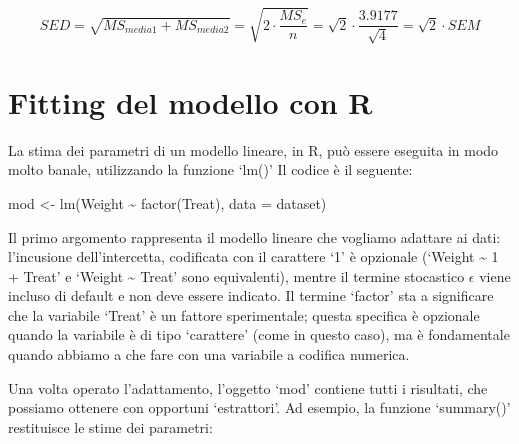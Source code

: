 \documentclass[a4paper,12pt,oneside]{book}
\newenvironment{Shaded}{\begin{snugshade}}{\end{snugshade}}
\newcommand{\SpecialCharTok}[1]{#1}
\newcommand{\OtherTok}[1]{#1}
\newcommand{\FunctionTok}[1]{#1}
\newcommand{\AttributeTok}[1]{#1}
\newcommand{\NormalTok}[1]{#1}
\begin{document}
\[SED = \sqrt{ MS_{media1} + MS_{media2} } = \sqrt{ 2 \cdot \frac{MS_e}{n} } =  \sqrt{2}  \cdot \frac{3.9177}{\sqrt{4}} = \sqrt{2} \cdot SEM\]

\hypertarget{fitting-del-modello-con-r}{%
\section{Fitting del modello con R}\label{fitting-del-modello-con-r}}

La stima dei parametri di un modello lineare, in R, può essere eseguita in modo molto banale, utilizzando la funzione `lm()' Il codice è il seguente:

\begin{Shaded}
\begin{Highlighting}[]
\NormalTok{mod }\OtherTok{\textless{}{-}} \FunctionTok{lm}\NormalTok{(Weight }\SpecialCharTok{\textasciitilde{}} \FunctionTok{factor}\NormalTok{(Treat), }\AttributeTok{data =}\NormalTok{ dataset)}
\end{Highlighting}
\end{Shaded}

Il primo argomento rappresenta il modello lineare che vogliamo adattare ai dati: l'incusione dell'intercetta, codificata con il carattere `1' è opzionale (`Weight \textasciitilde{} 1 + Treat' e `Weight \textasciitilde{} Treat' sono equivalenti), mentre il termine stocastico \(\epsilon\) viene incluso di default e non deve essere indicato. Il termine `factor' sta a significare che la variabile `Treat' è un fattore sperimentale; questa specifica è opzionale quando la variabile è di tipo `carattere' (come in questo caso), ma è fondamentale quando abbiamo a che fare con una variabile a codifica numerica.

Una volta operato l'adattamento, l'oggetto `mod' contiene tutti i risultati, che possiamo ottenere con opportuni `estrattori'. Ad esempio, la funzione `summary()' restituisce le stime dei parametri:

\vspace{12pt}

\tiny
\end{document}
